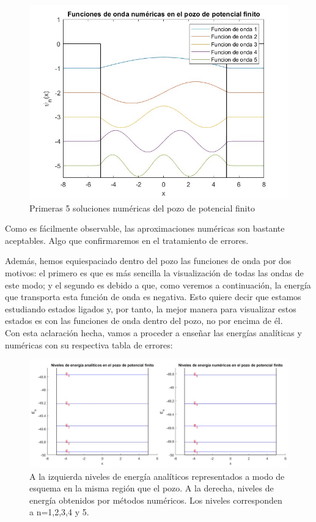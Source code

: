 \documentclass[12pt]{article}
\begin{document}
\begin{figure}[H]
    \centering
    \includegraphics[width=1.0\textwidth]{numericas.jpg}
    \caption{Primeras 5 soluciones numéricas del pozo de potencial finito}
\end{figure} 
Como es fácilmente observable, las aproximaciones numéricas
son bastante aceptables. Algo que confirmaremos en el tratamiento
de errores. \\
\par 
Además, hemos equiespaciado dentro del pozo las funciones de onda
por dos motivos: el primero es que es más sencilla la visualización
de todas las ondas de este modo; y el segundo es debido a que,
como veremos a continuación, la energía que transporta esta 
función de onda es negativa. Esto quiere decir que estamos 
estudiando estados ligados y, por tanto, la mejor manera para 
visualizar estos estados es con las funciones de onda dentro del
pozo, no por encima de él. \\

Con esta aclaración hecha, vamos a proceder a enseñar las 
energías analíticas y numéricas con su respectiva tabla de 
errores:

\begin{figure}[H]
    \centering
    \begin{adjustbox}{width=1.2\linewidth,center}
        \includegraphics{fotos/comp_energias_finito.png}
    \end{adjustbox}
    \caption{A la izquierda niveles de energía analíticos representados a modo de esquema en la misma región que el pozo. A la derecha, niveles de energía obtenidos por métodos numéricos. Los niveles corresponden a n=1,2,3,4 y 5.}
\end{figure}
\end{document}
